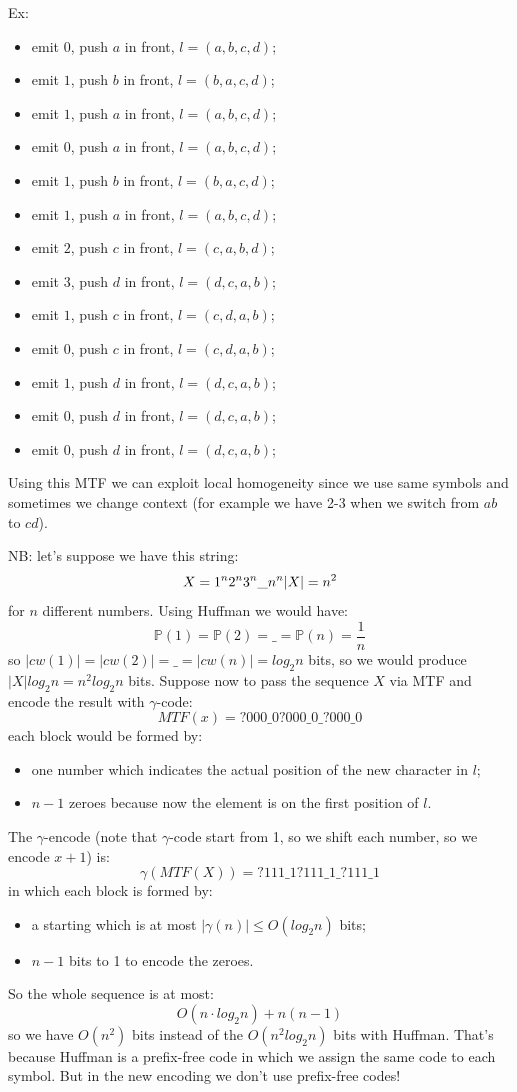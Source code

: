 Ex:
\begin{itemize}
    \item emit $0$, push $a$ in front, $l=(a, b, c, d)$;
    \item emit $1$, push $b$ in front, $l=(b, a, c, d)$;
    \item emit $1$, push $a$ in front, $l=(a, b, c, d)$;
    \item emit $0$, push $a$ in front, $l=(a, b, c, d)$;
    \item emit $1$, push $b$ in front, $l=(b, a, c, d)$;
    \item emit $1$, push $a$ in front, $l=(a, b, c, d)$;
    \item emit $2$, push $c$ in front, $l=(c, a, b, d)$;
    \item emit $3$, push $d$ in front, $l=(d, c, a, b)$;
    \item emit $1$, push $c$ in front, $l=(c, d, a, b)$;
    \item emit $0$, push $c$ in front, $l=(c, d, a, b)$;
    \item emit $1$, push $d$ in front, $l=(d, c, a, b)$;
    \item emit $0$, push $d$ in front, $l=(d, c, a, b)$;
    \item emit $0$, push $d$ in front, $l=(d, c, a, b)$;
\end{itemize}
Using this MTF we can exploit local homogeneity since we use same symbols and sometimes we change context (for example we have 2-3 when we switch from $ab$ to $cd$).

NB: let's suppose we have this string:
$$
    X = 1^n 2^n 3^n \_ n^n \\
    |X| = n^2
$$
for $n$ different numbers.
Using Huffman we would have:
$$
    \mathbb{P}(1) = \mathbb{P}(2) = \_ = \mathbb{P}(n) = \frac{1}{n}
$$
so $|cw(1)| = |cw(2)| = \_ = |cw(n)| = log_2 n$ bits, so we would produce $|X|log_2 n = n^2log_2 n$ bits.
Suppose now to pass the sequence $X$ via MTF and encode the result with $\gamma$-code:
$$
    MTF(x) = ?000\_0?000\_0\_?000\_0
$$
each block would be formed by:
\begin{itemize}
    \item one number which indicates the actual position of the new character in $l$;
    \item $n-1$ zeroes because now the element is on the first position of $l$.
\end{itemize}
The $\gamma$-encode (note that $\gamma$-code start from 1, so we shift each number, so we encode $x+1$) is:
$$
    \gamma(MTF(X)) = ?111\_1?111\_1\_?111\_1
$$
in which each block is formed by:
\begin{itemize}
    \item a starting which is at most $|\gamma(n)| \leq O(log_2 n)$ bits;
    \item $n-1$ bits to 1 to encode the zeroes.
\end{itemize}
So the whole sequence is at most:
$$
    O(n \cdot log_2 n)  + n(n-1)
$$
so we have $O(n^2)$ bits instead of the $O(n^2log_2 n)$ bits with Huffman.
That's because Huffman is a prefix-free code in which we assign the same code to each symbol.
But in the new encoding we don't use prefix-free codes!

